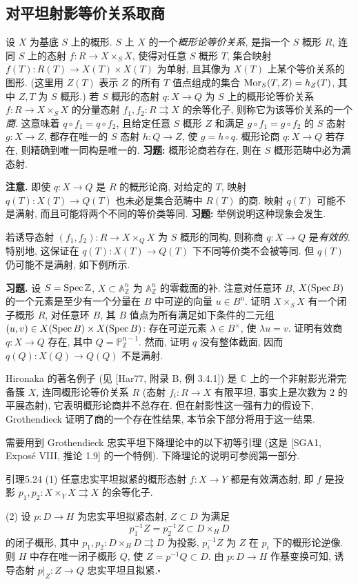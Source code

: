 \subsection{对平坦射影等价关系取商}\label{ch05:sec5.6.3}
设 $X$ 为基底 $S$ 上的概形. $S$ 上 $X$ 的一个\emph{概形论等价关系}, 是指一个 $S$ 概形 $R$, 连同 $S$ 上的态射 $f:R\to X\times_S X$, 使得对任意 $S$ 概形 $T$, 集合映射 $f(T):R(T)\to X(T)\times X(T)$ 为单射, 且其像为 $X(T)$ 上某个等价关系的图形. (这里用 $Z(T)$ 表示 $Z$ 的所有 $T$ 值点组成的集合 $\operatorname{Mor}_S(T,Z)=h_Z(T)$, 其中 $Z,T$ 为 $S$ 概形.)
若 $S$ 概形的态射 $q:X\to Q$ 为 $S$ 上的概形论等价关系 $f:R\to X\times_S X$ 的分量态射 $f_1,f_2:R\rightrightarrows X$ 的余等化子, 则称它为该等价关系的一个\emph{商}. 这意味着 $q\circ f_1=q\circ f_2$, 且给定任意 $S$ 概形 $Z$ 和满足 $g\circ f_1=g\circ f_2$ 的 $S$ 态射 $g:X\to Z$, 都存在唯一的 $S$ 态射 $h:Q\to Z$, 使 $g=h\circ q$. 概形论商 $q:X\to Q$ 若存在, 则精确到唯一同构是唯一的. \textbf{习题:} 概形论商若存在, 则在 $S$ 概形范畴中必为满态射.

\textbf{注意.} 即使 $q:X\to Q$ 是 $R$ 的概形论商, 对给定的 $T$, 映射 $q(T):X(T)\to Q(T)$ 也未必是集合范畴中 $R(T)$ 的商. 映射 $q(T)$ 可能不是满射, 而且可能将两个不同的等价类等同. \textbf{习题:} 举例说明这种现象会发生.

若诱导态射 $(f_1,f_2):R\to X\times_Q X$ 为 $S$ 概形的同构, 则称商 $q:X\to Q$ 是\emph{有效的}. 特别地, 这保证在 $q(T):X(T)\to Q(T)$ 下不同等价类不会被等同. 但 $q(T)$ 仍可能不是满射, 如下例所示.

\textbf{习题.} 设 $S=\operatorname{Spec}\mathbb Z$, $X\subset\mathbb A^n_{\mathbb Z}$ 为 $\mathbb A^n_{\mathbb Z}$ 的零截面的补. 注意对任意环 $B$, $X(\operatorname{Spec} B)$ 的一个元素是至少有一个分量在 $B$ 中可逆的向量 $u\in B^n$. 证明 $X\times_S X$ 有一个闭子概形 $R$, 对任意环 $B$, 其 $B$ 值点为所有满足如下条件的二元组 $(u,v)\in X(\operatorname{Spec} B)\times X(\operatorname{Spec} B)$: 存在可逆元素 $\lambda\in B^\times$, 使 $\lambda u=v$. 证明有效商 $q:X\to Q$ 存在, 其中 $Q=\mathbb P^{n-1}_{\mathbb Z}$. 然而, 证明 $q$ 没有整体截面, 因而 $q(Q):X(Q)\to Q(Q)$ 不是满射.

Hironaka 的著名例子 (见 [Har77, 附录 B, 例 3.4.1]) 是 $\mathbb C$ 上的一个非射影光滑完备簇 $X$, 连同概形论等价关系 $R$ (态射 $f_i:R\to X$ 有限平坦, 事实上是次数为 $2$ 的平展态射), 它表明概形论商并不总存在. 但在射影性这一强有力的假设下, Grothendieck 证明了商的一个存在性结果, 本节余下部分将用于这一结果.

需要用到 Grothendieck 忠实平坦下降理论中的以下初等引理 (这是 [SGA1, Expos\'e VIII, 推论 1.9] 的一个特例). 下降理论的说明可参阅第一部分.
\begin{origstatement}{引理}{5.24}\label{ch05:lem5.24}
(1) 任意忠实平坦拟紧的概形态射 $f:X\to Y$ 都是有效满态射, 即 $f$ 是投影 $p_1,p_2:X\times_Y X\rightrightarrows X$ 的余等化子.

(2) 设 $p:D\to H$ 为忠实平坦拟紧态射, $Z\subset D$ 为满足
\[
 p_1^{-1}Z=p_2^{-1}Z\subset D\times_H D
\]
的闭子概形, 其中 $p_1,p_2:D\times_H D\rightrightarrows D$ 为投影, $p_i^{-1}Z$ 为 $Z$ 在 $p_i$ 下的概形论逆像. 则 $H$ 中存在唯一闭子概形 $Q$, 使 $Z=p^{-1}Q\subset D$. 由 $p:D\to H$ 作基变换可知, 诱导态射 $p|_Z:Z\to Q$ 忠实平坦且拟紧.\hfill$\square$
\end{origstatement}

